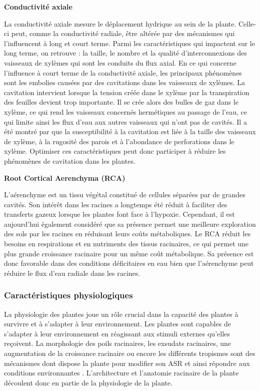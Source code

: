 \noindent \textbf{Conductivité axiale}

La conductivité axiale mesure le déplacement hydrique au sein de la plante.
Celle-ci peut, comme la conductivité radiale, être altérée par des mécanismes qui l'influencent à long et court terme.
Parmi les caractéristiques qui impactent sur le long terme, on retrouve : la taille, le nombre et la qualité d'interconnexions des vaisseaux de xylèmes qui sont les conduits du flux axial.
En ce qui concerne l'influence à court terme de la conductivité axiale, les principaux phénomènes sont les embolies causées par des cavitations dans les vaisseaux de xylèmes.
La cavitation intervient lorsque la tension créée dans le xylème par la transpiration des feuilles devient trop importante.
Il se crée alors des bulles de gaz dans le xylème, ce qui rend les vaisseaux concernés hermétiques au passage de l'eau, ce qui limite ainsi les flux d'eau aux autres vaisseaux qui n'ont pas de cavités.
Il a été montré par \cite{delzon_mechanism_2010} que la susceptibilité à la cavitation est liée à la taille des vaisseaux de xylème, à la rugosité des parois et à l'abondance de perforations dans le xylème.
Optimiser ces caractéristiques peut donc participer à réduire les phénomènes de cavitation dans les plantes.
\newline

\noindent \textbf{Root Cortical Aerenchyma (RCA)}

L'aérenchyme est un tissu végétal constitué de cellules séparées par de grandes cavités.
Son intérêt dans les racines a longtemps été réduit à faciliter des transferts gazeux lorsque les plantes font face à l'hypoxie.
Cependant, il est aujourd'hui également considéré que sa présence permet une meilleure exploration des sols par les racines en réduisant leurs coûts métaboliques.
Le RCA réduit les besoins en respirations et en nutriments des tissus racinaires, ce qui permet une plus grande croissance racinaire pour un même coût métabolique.
Sa présence est donc favorable dans des conditions déficitaires en eau bien que l'aérenchyme peut réduire le flux d'eau radiale dans les racines.

\subsubsection{Caractéristiques physiologiques}

La physiologie des plantes joue un rôle crucial dans la capacité des plantes à survivre et à s'adapter à leur environnement.
Les plantes sont capables de s'adapter à leur environnement en réagissant aux stimuli externes qu'elles reçoivent.
La morphologie des poils racinaires, les exsudats racinaires, une augmentation de la croissance racinaire ou encore les différents tropismes sont des mécanismes dont dispose la plante pour modifier son ASR et ainsi répondre aux conditions environnantes \citep{dunbabin_modelling_2013}.
L'architecture et l'anatomie racinaire de la plante découlent donc en partie de la physiologie de la plante.
\newline

